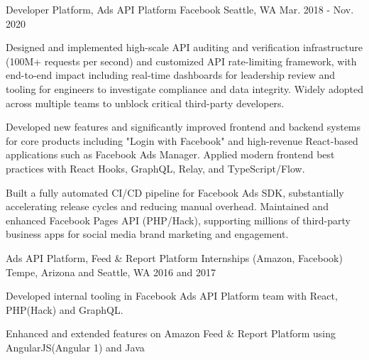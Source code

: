 \begin{cventries}

	\cventry
	{Developer Platform, Ads API Platform} %
	{Facebook} %
	{Seattle, WA} %
	{Mar. 2018 - Nov. 2020} %
	{
		\begin{cvitems}
			\item{Designed and implemented high-scale API auditing and verification infrastructure (100M+ requests per second) and customized API rate-limiting framework, with end-to-end impact including real-time dashboards for leadership review and tooling for engineers to investigate compliance and data integrity. Widely adopted across multiple teams to unblock critical third-party developers.} %
			\item{Developed new features and significantly improved frontend and backend systems for core products including "Login with Facebook" and high-revenue React-based applications such as Facebook Ads Manager. Applied modern frontend best practices with React Hooks, GraphQL, Relay, and TypeScript/Flow.} %
			\item{Built a fully automated CI/CD pipeline for Facebook Ads SDK, substantially accelerating release cycles and reducing manual overhead. Maintained and enhanced Facebook Pages API (PHP/Hack), supporting millions of third-party business apps for social media brand marketing and engagement.} %
		\end{cvitems}
	}




	\cventry
	{Ads API Platform, Feed \& Report Platform} %
	{Internships (Amazon, Facebook)} %
	{Tempe, Arizona and Seattle, WA} %
	{2016 and 2017} %
	{
		\begin{cvitems}
			\item{Developed internal tooling in Facebook Ads API Platform team with React, PHP(Hack) and GraphQL.}
			\item{Enhanced and extended features on Amazon Feed \& Report Platform using AngularJS(Angular 1) and Java}
		\end{cvitems}
	}

  


\end{cventries}